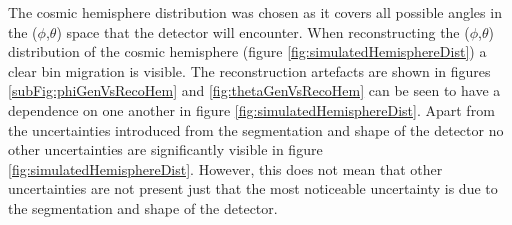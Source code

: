 The cosmic hemisphere distribution was chosen as it covers all possible angles in the ($\phi$,$\theta$) space that the detector will encounter. When reconstructing the ($\phi$,$\theta$) distribution of the cosmic hemisphere (figure \ref{fig:simulatedHemisphereDist}) a clear bin migration is visible. The reconstruction artefacts are shown in figures \ref{subFig:phiGenVsRecoHem} and \ref{fig:thetaGenVsRecoHem} can be seen to have a dependence on one another in figure \ref{fig:simulatedHemisphereDist}. Apart from the uncertainties introduced from the segmentation and shape of the detector no other uncertainties are significantly visible in figure \ref{fig:simulatedHemisphereDist}. However, this does not mean that other uncertainties are not present just that the most noticeable uncertainty is due to the segmentation and shape of the detector. 


